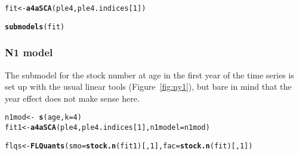 \documentclass[a4paper,english,10pt]{article}\usepackage[]{graphicx}\usepackage[]{color}
\makeatletter
\newcommand{\hlnum}[1]{\textcolor[rgb]{0.686,0.059,0.569}{#1}}%
\newcommand{\hlopt}[1]{\textcolor[rgb]{0,0,0}{#1}}%
\newcommand{\hlstd}[1]{\textcolor[rgb]{0.345,0.345,0.345}{#1}}%
\newcommand{\hlkwb}[1]{\textcolor[rgb]{0.69,0.353,0.396}{#1}}%
\newcommand{\hlkwc}[1]{\textcolor[rgb]{0.333,0.667,0.333}{#1}}%
\newcommand{\hlkwd}[1]{\textcolor[rgb]{0.737,0.353,0.396}{\textbf{#1}}}%
\newenvironment{kframe}{%
 \def\at@end@of@kframe{}%
 \ifinner\ifhmode%
  \def\at@end@of@kframe{\end{minipage}}%
  \begin{minipage}{\columnwidth}%
 \fi\fi%
 \def\FrameCommand##1{\hskip\@totalleftmargin \hskip-\fboxsep
 \colorbox{shadecolor}{##1}\hskip-\fboxsep
     \hskip-\linewidth \hskip-\@totalleftmargin \hskip\columnwidth}%
 \MakeFramed {\advance\hsize-\width
   \@totalleftmargin\z@ \linewidth\hsize
   \@setminipage}}%
 {\par\unskip\endMakeFramed%
 \at@end@of@kframe}
\newenvironment{knitrout}{}{} %
\makeatother
\begin{document}
\begin{knitrout}
\color{fgcolor}\begin{kframe}
\begin{alltt}
\hlstd{fit} \hlkwb{<-} \hlkwd{a4aSCA}\hlstd{(ple4, ple4.indices[}\hlnum{1}\hlstd{])}
\end{alltt}


{\ttfamily\noindent\bfseries{}}\begin{alltt}
\hlkwd{submodels}\hlstd{(fit)}
\end{alltt}


{\ttfamily\noindent\bfseries{}}\end{kframe}
\end{knitrout}

\subsubsection{N1 model}

The submodel for the stock number at age in the first year of the time series is set up with the usual linear tools (Figure~\ref{fig:ny1}), but bare in mind that the year effect does not make sense here.

\begin{knitrout}
\color{fgcolor}\begin{kframe}
\begin{alltt}
\hlstd{n1mod} \hlkwb{<-} \hlopt{~}\hlkwd{s}\hlstd{(age,} \hlkwc{k}\hlstd{=}\hlnum{4}\hlstd{)}
\hlstd{fit1} \hlkwb{<-} \hlkwd{a4aSCA}\hlstd{(ple4, ple4.indices[}\hlnum{1}\hlstd{],} \hlkwc{n1model}\hlstd{=n1mod)}
\end{alltt}


{\ttfamily\noindent\bfseries{}}\begin{alltt}
\hlstd{flqs} \hlkwb{<-} \hlkwd{FLQuants}\hlstd{(}\hlkwc{smo}\hlstd{=}\hlkwd{stock.n}\hlstd{(fit1)[,}\hlnum{1}\hlstd{],} \hlkwc{fac}\hlstd{=}\hlkwd{stock.n}\hlstd{(fit)[,}\hlnum{1}\hlstd{])}
\end{alltt}


{\ttfamily\noindent\bfseries{}}\end{kframe}
\end{knitrout}
\end{document}
